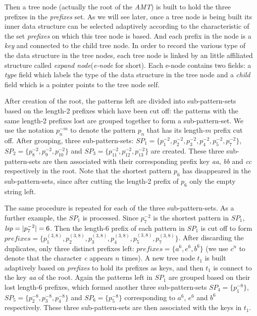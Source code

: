 \documentclass[a4paper]{article}
\begin{document}
Then a tree node (actually the root of the \emph{AMT}) is built to
hold the three prefixes in the \emph{prefixes} set. As we will see
later, once a tree node is being built its inner data structure can be
selected adaptively according to the characteristic of the set
\emph{prefixes} on which this tree node is based. And each prefix in
the node is a \emph{key} and connected to the child tree node. In
order to record the various type of the data structure in the tree
nodes, each tree node is linked by an little affiliated structure
called \emph{expand node}(\emph{e-node} for short). Each e-node
contains two fields: a \emph{type} field which labels the type of the
data structure in the tree node and a \emph{child} field which is a
pointer points to the tree node self.

After creation of the root, the patterns left are divided into
sub-pattern-sets based on the length-2 prefixes which have been cut
off: the patterns with the same length-2 prefixes lost are grouped
together to form a sub-pattern-set. We use the notation $p_n^{-m}$ to
denote the pattern $p_n$ that has its length-$m$ prefix cut off. After
grouping, three sub-pattern-sets: $SP_1 = \{p_1^{-2}, p_2^{-2},
p_3^{-2}, p_4^{-2}, p_5^{-2}, p_7^{-2}\}$, $SP_2 = \{p_8^{-2},
p_9^{-2}, p_{10}^{-2}\}$ and $SP_3 = \{p_{11}^{-2}, p_{12}^{-2},
p_{13}^{-2}\}$ are created. These three sub-pattern-sets are then
associated with their corresponding prefix key \emph{aa}, \emph{bb}
and \emph{cc} respectively in the root. Note that the shortest pattern
$p_6$ has disappeared in the sub-pattern-sets, since after cutting the
length-2 prefix of $p_6$ only the empty string left.

The same procedure is repeated for each of the three
sub-pattern-sets. As a further example, the $SP_1$ is processed. Since
$p_7^{-2}$ is the shortest pattern in $SP_1$, $\emph{lsp} = |p_7^{-2}|
= 6$. Then the length-$6$ prefix of each pattern in $SP_1$ is cut off
to form $prefixes = \{p_1^{(3,8)}, p_2^{(3,8)}, p_3^{(3,8)},
p_4^{(3,8)}, p_5^{(3,8)}, p_7^{(3,8)}\}$. After discarding the
duplicates, only three distinct prefixes left: $prefixes = \{a^6, e^6,
b^6\}$ (we use $c^n$ to denote that the character \emph{c} appears $n$
times).  A new tree node $t_1$ is built adaptively based on
\emph{prefixes} to hold its prefixes as keys, and then $t_1$ is
connect to the key \emph{aa} of the root. Again the patterns left in
$SP_1$ are grouped based on their lost length-6 prefixes, which formed
another three sub-pattern-sets $SP_4 = \{p_1^{-8}\}$, $SP_5 =
\{p_2^{-8}, p_3^{-8}, p_4^{-8}\}$ and $SP_6 = \{p_5^{-8}\}$
corresponding to $a^6$, $e^6$ and $b^6$ respectively. These three
sub-pattern-sets are then associated with the keys in $t_1$.
 
\end{document}
